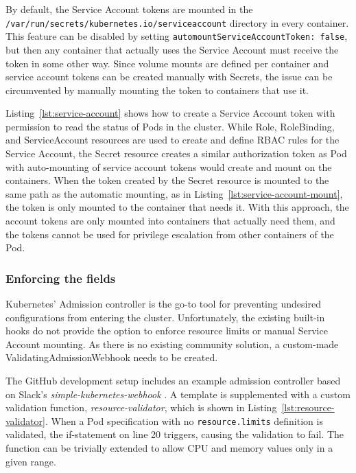 \documentclass[english, 12pt, a4paper, sci, utf8, a-2b, online]{aaltothesis}
\begin{document}
By default, the Service Account tokens are mounted in the \lstinline{/var/run/secrets/kubernetes.io/serviceaccount} directory in every container.
This feature can be disabled by setting \lstinline{automountServiceAccountToken: false}, but then any container that actually uses the Service Account must receive the token in some other way.
Since volume mounts are defined per container and service account tokens can be created manually with Secrets, the issue can be circumvented by manually mounting the token to containers that use it.



Listing~\ref{lst:service-account} shows how to create a Service Account token with permission to read the status of Pods in the cluster.
While Role, RoleBinding, and ServiceAccount resources are used to create and define RBAC rules for the Service Account, the Secret resource creates a similar authorization token as Pod with auto-mounting of service account tokens would create and mount on the containers.
When the token created by the Secret resource is mounted to the same path as the automatic mounting, as in Listing~\ref{lst:service-account-mount}, the token is only mounted to the container that needs it.
With this approach, the account tokens are only mounted into containers that actually need them, and the tokens cannot be used for privilege escalation from other containers of the Pod.



\subsubsection{Enforcing the fields}

Kubernetes' Admission controller is the go-to tool for preventing undesired configurations from entering the cluster.
Unfortunately, the existing built-in hooks do not provide the option to enforce resource limits or manual Service Account mounting.
As there is no existing community solution, a custom-made ValidatingAdmissionWebhook needs to be created.

The GitHub development setup includes an example admission controller based on Slack's \emph{simple-kubernetes-webhook} \cite{simple-kubernetes-webhook}.
A template is supplemented with a custom validation function, \emph{resource-validator}, which is shown in Listing~\ref{lst:resource-validator}.
When a Pod specification with no \lstinline{resource.limits} definition is validated, the if-statement on line 20 triggers, causing the validation to fail.
The function can be trivially extended to allow CPU and memory values only in a given range.
\end{document}

